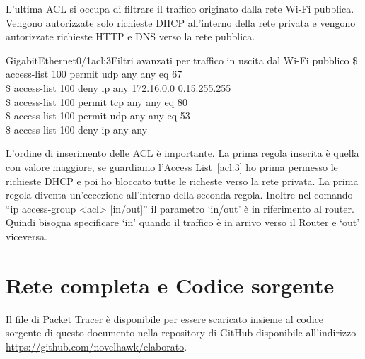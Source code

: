 L'ultima ACL si occupa di filtrare il traffico originato dalla rete Wi-Fi pubblica. Vengono autorizzate solo richieste DHCP all'interno della rete privata e vengono autorizzate richieste HTTP e DNS verso la rete pubblica.

\begin{cmds}[in]{GigabitEthernet0/1}{acl:3}{Filtri avanzati per traffico in uscita dal Wi-Fi pubblico}
    \$ access-list 100 permit udp any any eq 67\\
    \$ access-list 100 deny ip any 172.16.0.0 0.15.255.255\\
    \$ access-list 100 permit tcp any any eq 80\\
    \$ access-list 100 permit udp any any eq 53\\
    \$ access-list 100 deny ip any any
\end{cmds}

L'ordine di inserimento delle ACL \`e importante. La prima regola inserita \`e quella con valore maggiore, se guardiamo l'Access List~\ref{acl:3} ho prima permesso le richieste DHCP e poi ho bloccato tutte le richeste verso la rete privata. La prima regola diventa un'eccezione all'interno della seconda regola. Inoltre nel comando ``ip access-group <acl> [in/out]'' il parametro `in/out' \`e in riferimento al router. Quindi bisogna specificare `in' quando il traffico \`e in arrivo verso il Router e `out' viceversa.

\section{Rete completa e Codice sorgente}

Il file di Packet Tracer \`e disponibile per essere scaricato insieme al codice sorgente di questo documento nella repository di GitHub disponibile all'indirizzo \url{https://github.com/novelhawk/elaborato}.